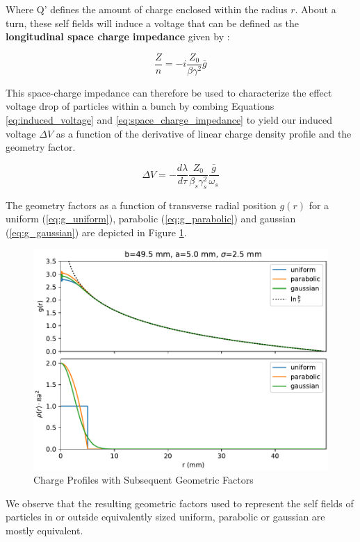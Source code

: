 Where Q' defines the amount of charge enclosed within the radius $r$. About a turn, these self fields will induce a voltage that can be defined as the \textbf{longitudinal space charge impedance} given by \cite{lee_accelerator_2004}:

\begin{equation}
    \frac{Z}{n} = -i\frac{Z_0}{\beta\gamma^2}\bar{g}
    \label{eq:space_charge_impedance}
\end{equation}

This space-charge impedance can therefore be used to characterize the effect voltage drop of particles within a bunch by combing Equations \ref{eq:induced_voltage} and  \ref{eq:space_charge_impedance} to yield our induced voltage $\Delta V$ as a function of the derivative of linear charge density profile and the geometry factor.

$$\Delta V = -\frac{d\lambda}{d\tau}\frac{Z_0}{\beta_s\gamma_s^2}\frac{\bar{g}}{\omega_s}$$

The geometry factors as a function of transverse radial position $g(r)$ for a uniform (\ref{eq:g_uniform}), parabolic (\ref{eq:g_parabolic}) and gaussian (\ref{eq:g_gaussian}) are depicted in Figure \ref{fig:geometry_factors}.

\begin{figure}
    \centering
    \includegraphics{./figs/geometric_factors.pdf}
    \caption{Charge Profiles with Subsequent Geometric Factors}
    \label{fig:geometry_factors}
\end{figure}

We observe that the resulting geometric factors used to represent the self fields of particles in or outside equivalently sized uniform, parabolic or gaussian are mostly equivalent.

